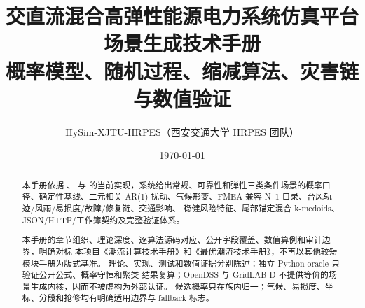 \documentclass[UTF8,fontset=fandol,a4paper,11pt]{ctexart}
\title{\textbf{交直流混合高弹性能源电力系统仿真平台}\\[0.5em]
       {\Large 场景生成技术手册}\\[0.3em]
       {\large 概率模型、随机过程、缩减算法、灾害链与数值验证}}
\author{HySim-XJTU-HRPES（西安交通大学 HRPES 团队）}
\date{\today}
\begin{document}
\maketitle
\begin{abstract}
本手册依据 、
 与 
的当前实现，系统给出常规、可靠性和弹性三类条件场景的概率口径、确定性基线、二元相关
AR(1) 扰动、气候形变、FMEA 兼容 N--1 目录、台风轨迹/风雨/易损度/故障/修复链、交通影响、
稳健风险特征、尾部锚定混合 k-medoids、JSON/HTTP/工作簿契约及完整验证体系。

本手册的章节组织、理论深度、逐算法源码对应、公开字段覆盖、数值算例和审计边界，明确对标
本项目《潮流计算技术手册》和《最优潮流技术手册》，不再以其他较短模块手册为版式基准。
理论、实现、测试和数值证据分别陈述：独立 Python oracle 只验证公开公式、概率守恒和聚类
结果复算；OpenDSS 与 GridLAB-D 不提供等价的场景生成内核，因而不被虚构为外部认证。
候选概率只在族内归一；气候、易损度、坐标、分段和抢修均有明确适用边界与 fallback 标志。
\end{abstract}

\tableofcontents
\newpage





















\end{document}
